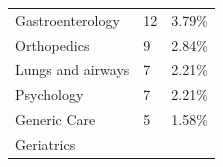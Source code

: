 \documentclass[]{article}
\begin{document}
\begin{longtable}[]{@{}lll@{}}
\begin{minipage}[t]{0.34\columnwidth}
Gastroenterology\strut
\end{minipage} & \begin{minipage}[t]{0.18\columnwidth}\raggedright
12\strut
\end{minipage} & \begin{minipage}[t]{0.18\columnwidth}\raggedright
3.79\%\strut
\end{minipage}\tabularnewline
\begin{minipage}[t]{0.34\columnwidth}\raggedright
Orthopedics\strut
\end{minipage} & \begin{minipage}[t]{0.18\columnwidth}\raggedright
9\strut
\end{minipage} & \begin{minipage}[t]{0.18\columnwidth}\raggedright
2.84\%\strut
\end{minipage}\tabularnewline
\begin{minipage}[t]{0.34\columnwidth}\raggedright
Lungs and airways\strut
\end{minipage} & \begin{minipage}[t]{0.18\columnwidth}\raggedright
7\strut
\end{minipage} & \begin{minipage}[t]{0.18\columnwidth}\raggedright
2.21\%\strut
\end{minipage}\tabularnewline
\begin{minipage}[t]{0.34\columnwidth}\raggedright
Psychology\strut
\end{minipage} & \begin{minipage}[t]{0.18\columnwidth}\raggedright
7\strut
\end{minipage} & \begin{minipage}[t]{0.18\columnwidth}\raggedright
2.21\%\strut
\end{minipage}\tabularnewline
\begin{minipage}[t]{0.34\columnwidth}\raggedright
Generic Care\strut
\end{minipage} & \begin{minipage}[t]{0.18\columnwidth}\raggedright
5\strut
\end{minipage} & \begin{minipage}[t]{0.18\columnwidth}\raggedright
1.58\%\strut
\end{minipage}\tabularnewline
\begin{minipage}[t]{0.34\columnwidth}\raggedright
Geriatrics\strut
\end{minipage} & \begin{minipage}[t]{0.18\columnwidth}\raggedright

\end{minipage}
\end{longtable}
\end{document}

